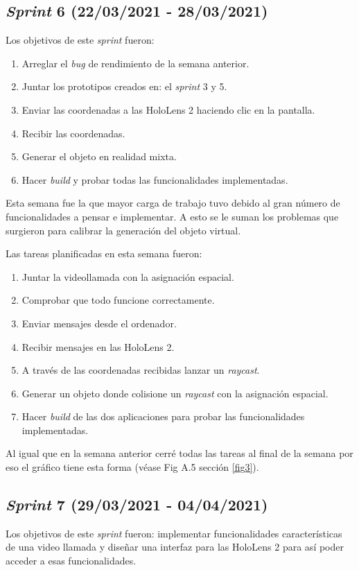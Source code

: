 \subsection{\textit{Sprint} 6 (22/03/2021 - 28/03/2021)}
Los objetivos de este \textit{sprint} fueron:
\begin{enumerate}
    \item Arreglar el \textit{bug} de rendimiento de la semana anterior.
    \item Juntar los prototipos creados en: el \textit{sprint} 3 y 5.
    \item Enviar las coordenadas a las HoloLens 2 haciendo clic en la pantalla.
    \item Recibir las coordenadas.
    \item Generar el objeto en realidad mixta.
    \item Hacer \textit{build} y probar todas las funcionalidades implementadas.
\end{enumerate}

Esta semana fue la que mayor carga de trabajo tuvo debido al gran número de funcionalidades a pensar e implementar. A esto se le suman los problemas que surgieron para calibrar la generación del objeto virtual.

Las tareas planificadas en esta semana fueron:
\begin{enumerate}
    \item Juntar la videollamada con la asignación espacial.
    \item Comprobar que todo funcione correctamente.
    \item Enviar mensajes desde el ordenador.
    \item Recibir mensajes en las HoloLens 2.
    \item A través de las coordenadas recibidas lanzar un \textit{raycast}.
    \item Generar un objeto donde colisione un \textit{raycast} con la asignación espacial.
    \item Hacer \textit{build} de las dos aplicaciones para probar las funcionalidades implementadas.
\end{enumerate}
Al igual que en la semana anterior cerré todas las tareas al final de la semana por eso el gráfico tiene esta forma (véase Fig A.5 sección \ref{fig3}).
\label{fig3}
\subsection{\textit{Sprint} 7 (29/03/2021 - 04/04/2021)}
Los objetivos de este \textit{sprint} fueron: implementar funcionalidades características de una video llamada y diseñar una interfaz para las HoloLens 2 para así poder acceder a esas funcionalidades.

